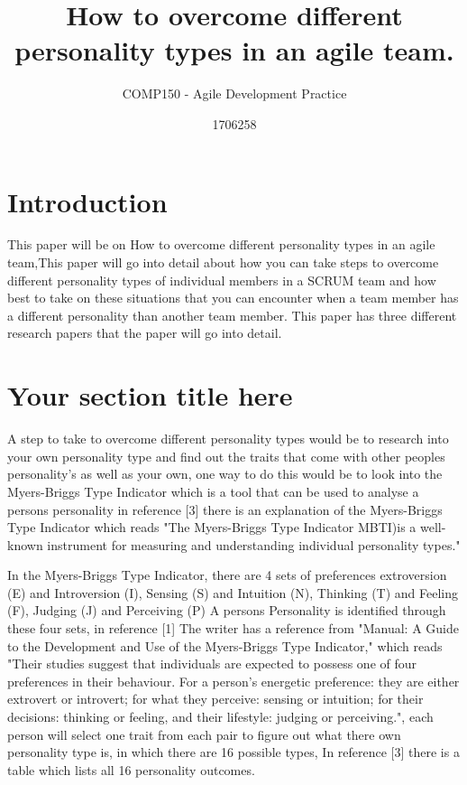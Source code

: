 \documentclass{scrartcl}
\title{How to overcome different personality types in an agile team.}
\subtitle{COMP150 - Agile Development Practice}
\author{1706258}
\begin{document}
\maketitle


\section{Introduction}
This paper will be on How to overcome different personality types in an agile team,This paper will go into detail about how you can take steps to overcome different personality types of individual members in a SCRUM team and how best to take on these situations that you can encounter when a team member has a different personality than another team member. This paper has three different research papers that the paper will go into detail.

\section{Your section title here}

A step to take to overcome different personality types would be to research into your own personality type and find out the traits that come with other peoples personality's as well as your own, one way to do this would be to look into the Myers-Briggs Type Indicator which is a tool that can be used to analyse a persons personality in reference [3] there is an explanation of the Myers-Briggs Type Indicator which reads "The Myers-Briggs Type Indicator MBTI)is a well-known instrument for measuring and understanding individual personality types."

In the Myers-Briggs Type Indicator, there are 4 sets of preferences extroversion (E) and Introversion (I), Sensing (S) and Intuition (N), Thinking (T) and Feeling (F), Judging (J) and Perceiving (P) A persons Personality is identified through these four sets, in reference [1] The writer has a reference from "Manual: A Guide to the Development and Use of the Myers-Briggs Type Indicator," which reads "Their studies suggest that individuals are expected to possess one of four preferences in their behaviour. For a person's energetic preference: they are either extrovert or introvert; for what they perceive: sensing or intuition; for their decisions: thinking or feeling, and their lifestyle: judging or perceiving.", each person will select one trait from each pair to figure out what there own personality type is, in which there are 16 possible types, In reference [3] there is a table which lists all 16 personality outcomes. 
\end{document}
